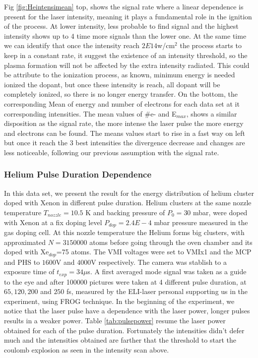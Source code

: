 Fig \ref{fig:Heintensimean} top, shows the signal rate where a linear dependence is present for the laser intensity, meaning it  plays a fundamental role in the ignition of the process. At lower intensity, less probable to find signal and the highest intensity shows up to 4 time more signals than the lower one. At the same time we can identify that once the intensity reach $2E14$w/cm$^{2}$ the process starts to keep in a constant rate, it suggest the existence of  an intensity threshold, so the plasma formation will not be affected by the extra intensity radiated. This could be attribute to the ionization process, as known, minimum energy is needed ionized the dopant, but once these intensity is reach, all dopant will be completely ionized, so there is no longer energy transfer. 
On the bottom, the corresponding Mean of energy and number of electrons for each data set at it corresponding intensities. The mean values of $\#$e- and E$_{max}$, shows a  similar  disposition as the signal rate, the more intense the laser pulse the more energy and electrons can be found. The means values start to rise in a fast way on left but once it reach the 3 best intensities the divergence decrease and changes are less noticeable, following our previous assumption with the signal rate.

 
\subsubsection{Helium Pulse Duration Dependence}
 
In this data set, we present the result for the energy distribution of helium cluster doped with Xenon in different pulse duration.  Helium clusters at the same nozzle temperature $T_{nozzle}=10.5$ K and  backing pressure of $P_{0}=30$ mbar, were doped with Xenon at a fix doping level $P_{dop}=2.4E-4$ mbar pressure measured in the gas doping cell. At this nozzle temperature the Helium forms big clusters, with approximated $N=3150000$ atoms before going through the oven chamber and its doped with Xe$_{dop}$=75 atoms. The VMI voltages were set to VMIx1 and the MCP and PHS to $1600$V and $4000$V respectively. The camera was stablish to a exposure time of $t_{exp}=34 \mu$s. A first averaged mode signal was taken as a guide to the eye and after 100000 pictures were taken at 4 different pulse duration, at $65, 120, 200$ and $250$  fs, measured by the ELI-laser personal supporting us in the experiment, using FROG technique.
In the beginning of the experiment, we notice that the laser pulse have a dependence with the laser power,  longer pulses results in a weaker power. Table \ref{tab:pulsepower} resume the laser power obtained for each of the pulse duration. Fortunately the intensities didn't defer much and the intensities obtained are farther that the threshold to start the coulomb explosion as seen in the intensity scan above.
  
